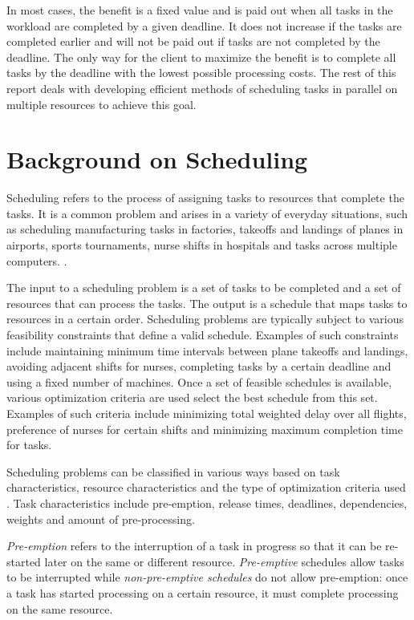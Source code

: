 \documentclass[12pt]{report}
\begin{document}
In most cases, the benefit is a fixed value and is paid out when all tasks in the workload are completed by a given deadline.
It does not increase if the tasks are completed earlier and will not be paid out if tasks are not completed by the deadline.
The only way for the client to maximize the benefit is to complete all tasks by the deadline with the lowest possible processing costs.
The rest of this report deals with developing efficient methods of scheduling tasks in parallel on multiple resources to achieve this goal.


\section{Background on Scheduling}

\label{SchedulingOverview}
Scheduling refers to the process of assigning tasks to resources that complete the tasks.
It is a common problem and arises in a variety of everyday situations, such as scheduling manufacturing tasks in factories, takeoffs and landings of planes in airports, sports tournaments, nurse shifts in hospitals and 	tasks across multiple computers. \cite{Hoos2004}.

The input to a scheduling problem is a set of tasks to be completed and a set of resources that can process the tasks.
The output is a schedule that maps tasks to resources in a certain order.
Scheduling problems are typically subject to various feasibility constraints that define a valid schedule.
Examples of such constraints include maintaining minimum time intervals between plane takeoffs and landings, avoiding adjacent shifts for nurses, completing tasks by a certain deadline and using a fixed number of machines.
Once a set of feasible schedules is available, various optimization criteria are used select the best schedule from this set.
Examples of such criteria include minimizing total weighted delay over all flights, preference of nurses for certain shifts and minimizing maximum completion time for tasks.

Scheduling problems can be classified in various ways based on task characteristics, resource characteristics and the type of optimization criteria used \cite{Hoos2004, Pinedo2012}. 
Task characteristics include pre-emption, release times, deadlines, dependencies, weights and amount of pre-processing.

\textit{Pre-emption} refers to the interruption of a task in progress so that it can be re-started later on the same or different resource.
\textit{Pre-emptive} schedules allow tasks to be interrupted while \textit{non-pre-emptive schedules} do not allow pre-emption: once a task has started processing on a certain resource, it must complete processing on the same resource.
\end{document}
